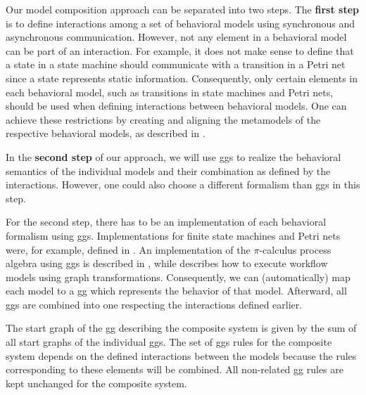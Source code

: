\documentclass[a4paper]{easychair}
\begin{document}
Our model composition approach can be separated into two steps.
The \textbf{first step} is to define interactions among a set of behavioral models using synchronous and asynchronous communication.
However, not any element in a behavioral model can be part of an interaction.
For example, it does not make sense to define that a state in a state machine should communicate with a transition in a Petri net since a state represents static information.
Consequently, only certain elements in each behavioral model, such as transitions in state machines and Petri nets, should be used when defining interactions between behavioral models.
One can achieve these restrictions by creating and aligning the metamodels of the respective behavioral models, as described in \cite{krauterBehavioralConsistencyHeterogeneous2021}.

In the \textbf{second step} of our approach, we will use \glspl*{gg} to realize the behavioral semantics of the individual models and their combination as defined by the interactions.
However, one could also choose a different formalism than \glspl*{gg} in this step.

For the second step, there has to be an implementation of each behavioral formalism using \glspl*{gg}.
Implementations for finite state machines and Petri nets were, for example, defined in \cite{krauterBehavioralConsistencyHeterogeneous2021}.
An implementation of the $\pi$-calculus process algebra using \glspl*{gg} is described in \cite{gadducciGraphRewritingPcalculus2007}, while \cite{rutleMetamodellingApproachBehavioural2012} describes how to execute workflow models using graph transformations.
Consequently, we can (automatically) map each model to a \gls*{gg} which represents the behavior of that model.
Afterward, all \glspl*{gg} are combined into one respecting the interactions defined earlier.

The start graph of the \gls*{gg} describing the composite system is given by the sum of all start graphs of the individual \glspl*{gg}.
The set of \glspl*{gg} rules for the composite system depends on the defined interactions between the models because the rules corresponding to these elements will be combined.
All non-related \gls*{gg} rules are kept unchanged for the composite system.
\end{document}
